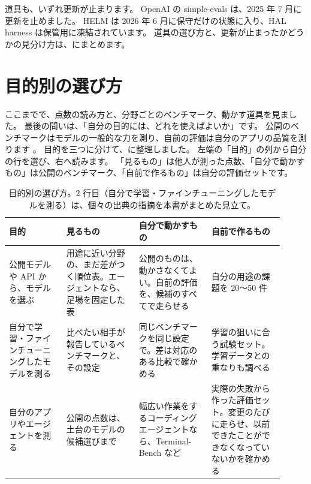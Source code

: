 道具も、いずれ更新が止まります。
OpenAI の simple-evals は、2025 年 7 月に更新を止めました。
HELM \cite{liang2022helm} は 2026 年 6 月に保守だけの状態に入り、HAL harness は保管用に凍結されています。
道具の選び方と、更新が止まったかどうかの見分け方は、にまとめます。

\section{目的別の選び方}\label{sec:bm-choose}

ここまでで、点数の読み方と、分野ごとのベンチマーク、動かす道具を見ました。
最後の問いは、「自分の目的には、どれを使えばよいか」です。
公開のベンチマークはモデルの一般的な力を測り、自前の評価は自分のアプリの品質を測ります \cite{husain2026evalsfaq}。
目的を三つに分けて、に整理しました。
左端の「目的」の列から自分の行を選び、右へ読みます。
「見るもの」は他人が測った点数、「自分で動かすもの」は公開のベンチマーク、「自前で作るもの」は自分の評価セットです。

\begin{table}[htbp]
\centering\small\setlength{\tabcolsep}{4pt}
\caption{目的別の選び方。2 行目（自分で学習・ファインチューニングしたモデルを測る）は、個々の出典の指摘を本書がまとめた見立て。}
\label{tab:bm-choose}
\begin{tabular}{@{}>{\raggedright\arraybackslash}p{0.19\linewidth}>{\raggedright\arraybackslash}p{0.24\linewidth}>{\raggedright\arraybackslash}p{0.24\linewidth}>{\raggedright\arraybackslash}p{0.24\linewidth}@{}}
\toprule
目的 & 見るもの & 自分で動かすもの & 自前で作るもの \\
\midrule
公開モデルや API から、モデルを選ぶ & 用途に近い分野の、まだ差がつく順位表。エージェントなら、足場を固定した表 & 公開のものは、動かさなくてよい。自前の評価を、候補のすべてで走らせる & 自分の用途の課題を 20〜50 件 \\
\addlinespace[0.2em]
自分で学習・ファインチューニングしたモデルを測る & 比べたい相手が報告しているベンチマークと、その設定 & 同じベンチマークを同じ設定で。差は対応のある比較で確かめる & 学習の狙いに合う試験セット。学習データとの重なりも調べる \\
\addlinespace[0.2em]
自分のアプリやエージェントを測る & 公開の点数は、土台のモデルの候補選びまで & 幅広い作業をするコーディングエージェントなら、Terminal-Bench など & 実際の失敗から作った評価セット。変更のたびに走らせ、以前できたことができなくなっていないかを確かめる \\
\bottomrule
\end{tabular}
\end{table}

